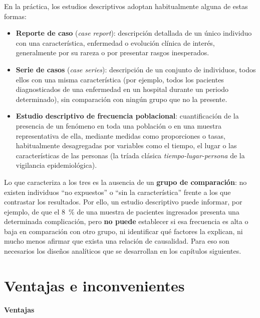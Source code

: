 \documentclass[
  spanish,
  a4paper,
]{scrreport}
\providecommand{\tightlist}{%
  \setlength{\itemsep}{0pt}\setlength{\parskip}{0pt}}
\theoremstyle{definition}
\theoremstyle{definition}
\theoremstyle{remark}
\begin{document}
En la práctica, los estudios descriptivos adoptan habitualmente alguna
de estas formas:

\begin{itemize}
\tightlist
\item
  \textbf{Reporte de caso} (\emph{case report}): descripción detallada
  de un único individuo con una característica, enfermedad o evolución
  clínica de interés, generalmente por su rareza o por presentar rasgos
  inesperados.
\item
  \textbf{Serie de casos} (\emph{case series}): descripción de un
  conjunto de individuos, todos ellos con una misma característica (por
  ejemplo, todos los pacientes diagnosticados de una enfermedad en un
  hospital durante un periodo determinado), sin comparación con ningún
  grupo que no la presente.
\item
  \textbf{Estudio descriptivo de frecuencia poblacional}: cuantificación
  de la presencia de un fenómeno en toda una población o en una muestra
  representativa de ella, mediante medidas como proporciones o tasas,
  habitualmente desagregadas por variables como el tiempo, el lugar o
  las características de las personas (la tríada clásica
  \emph{tiempo-lugar-persona} de la vigilancia epidemiológica).
\end{itemize}

Lo que caracteriza a los tres es la ausencia de un \textbf{grupo de
comparación}: no existen individuos ``no expuestos'' o ``sin la
característica'' frente a los que contrastar los resultados. Por ello,
un estudio descriptivo puede informar, por ejemplo, de que el 8~\% de
una muestra de pacientes ingresados presenta una determinada
complicación, pero \textbf{no puede} establecer si esa frecuencia es
alta o baja en comparación con otro grupo, ni identificar qué factores
la explican, ni mucho menos afirmar que exista una relación de
causalidad. Para eso son necesarios los diseños analíticos que se
desarrollan en los capítulos siguientes.

\section{Ventajas e inconvenientes}\label{ventajas-e-inconvenientes}

\textbf{Ventajas}
\end{document}
